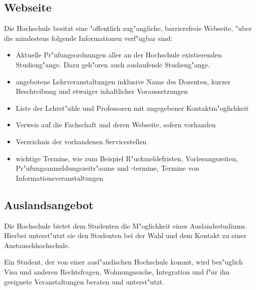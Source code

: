 \subsection{Webseite}

Die Hochschule besitzt eine "offentlich zug"angliche, barrierefreie Webseite, "uber die mindestens folgende Informationen verf"ugbar sind:
\begin{itemize}
\item Aktuelle Pr"ufungsordnungen aller an der Hochschule existierenden Studieng"ange. Dazu geh"oren auch auslaufende Studieng"ange.

\item angebotene Lehrveranstaltungen inklusive Name des Dozenten, kurzer Beschreibung und etwaiger inhaltlicher Voraussetzungen

\item Liste der Lehrst"uhle und Professoren mit angegebener Kontaktm"oglichkeit

\item Verweis auf die Fachschaft und deren Webseite, sofern vorhanden

\item Verzeichnis der vorhandenen Servicestellen

\item wichtige Termine, wie zum Beispiel R"uckmeldefristen, Vorlesungszeiten, Pr"ufungsanmeldungszeitr"aume und -termine, Termine von Informationsveranstaltungen
\end{itemize}


\subsection{Auslandsangebot}

Die Hochschule bietet dem Studenten die M"oglichkeit eines Auslandsstudiums. Hierbei
unterst"utzt sie den Studenten bei der Wahl und dem Kontakt zu einer Austauschhochschule.

Ein Student, der von einer ausl"andischen Hochschule kommt, wird bez"uglich
Visa und anderen Rechtsfragen, Wohnungssuche, Integration und f"ur ihn geeignete Veranstaltungen
beraten und unterst"utzt.
